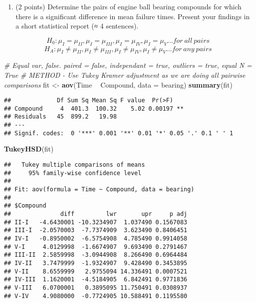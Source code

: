 \documentclass[
]{article}
\newenvironment{Shaded}{\begin{snugshade}}{\end{snugshade}}
\newcommand{\CommentTok}[1]{\textcolor[rgb]{0.56,0.35,0.01}{\textit{#1}}}
\newcommand{\DataTypeTok}[1]{\textcolor[rgb]{0.13,0.29,0.53}{#1}}
\newcommand{\KeywordTok}[1]{\textcolor[rgb]{0.13,0.29,0.53}{\textbf{#1}}}
\newcommand{\NormalTok}[1]{#1}
\newcommand{\OperatorTok}[1]{\textcolor[rgb]{0.81,0.36,0.00}{\textbf{#1}}}
\newcommand{\StringTok}[1]{\textcolor[rgb]{0.31,0.60,0.02}{#1}}
\providecommand{\tightlist}{%
  \setlength{\itemsep}{0pt}\setlength{\parskip}{0pt}}
\begin{document}
\begin{enumerate}
\def\labelenumi{(\alph{enumi})}
\setcounter{enumi}{1}
\tightlist
\item
  (2 points) Determine the pairs of engine ball bearing compounds for
  which there is a significant difference in mean failure times. Present
  your findings in a short statistical report (≈ 4 sentences).
\end{enumerate}

\[H_0: \mu_{I} = \mu_{II},  \mu_{I} = \mu_{III}, \mu_{I} = \mu_{IV}, \mu_{I} = \mu_{V} ... for \ all \ pairs \]
\[H_A: \mu_{I} \neq \mu_{II},  \mu_{I} \neq \mu_{III}, \mu_{I} \neq \mu_{IV}, \mu_{I} \neq \mu_{V} ... for \ any \ pairs \]

\begin{Shaded}
\begin{Highlighting}[]
\CommentTok{# Equal var, false. paired = false, independant = true, outliers = true, equal N = True}
\CommentTok{# METHOD - Use Tukey Kramer adjustment as we are doing all pairwise comparisons}
\NormalTok{fit <-}\StringTok{ }\KeywordTok{aov}\NormalTok{(Time }\OperatorTok{~}\StringTok{ }\NormalTok{Compound, }\DataTypeTok{data =}\NormalTok{ bearing)}
\KeywordTok{summary}\NormalTok{(fit)}
\end{Highlighting}
\end{Shaded}

\begin{verbatim}
##             Df Sum Sq Mean Sq F value  Pr(>F)   
## Compound     4  401.3  100.32    5.02 0.00197 **
## Residuals   45  899.2   19.98                   
## ---
## Signif. codes:  0 '***' 0.001 '**' 0.01 '*' 0.05 '.' 0.1 ' ' 1
\end{verbatim}

\begin{Shaded}
\begin{Highlighting}[]
\KeywordTok{TukeyHSD}\NormalTok{(fit)}
\end{Highlighting}
\end{Shaded}

\begin{verbatim}
##   Tukey multiple comparisons of means
##     95% family-wise confidence level
## 
## Fit: aov(formula = Time ~ Compound, data = bearing)
## 
## $Compound
##              diff         lwr       upr     p adj
## II-I   -4.6430001 -10.3234907  1.037490 0.1567083
## III-I  -2.0570003  -7.7374909  3.623490 0.8406451
## IV-I   -0.8950002  -6.5754908  4.785490 0.9914058
## V-I     4.0129998  -1.6674907  9.693490 0.2791467
## III-II  2.5859998  -3.0944908  8.266490 0.6964484
## IV-II   3.7479999  -1.9324907  9.428490 0.3453895
## V-II    8.6559999   2.9755094 14.336491 0.0007521
## IV-III  1.1620001  -4.5184905  6.842491 0.9771836
## V-III   6.0700001   0.3895095 11.750491 0.0308937
## V-IV    4.9080000  -0.7724905 10.588491 0.1195580
\end{verbatim}
\end{document}
